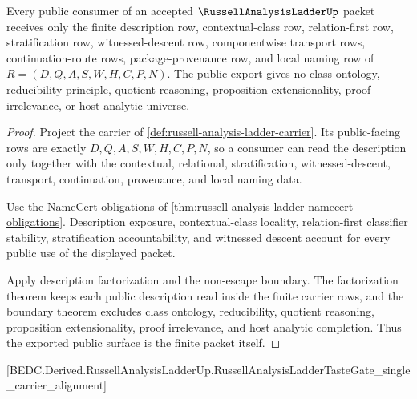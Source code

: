 \begin{theorem}
\label{thm:russell-analysis-ladder-public-export}
Every public consumer of an accepted $\RussellAnalysisLadderUp$ packet receives only the finite description row, contextual-class row, relation-first row, stratification row, witnessed-descent row, componentwise transport rows, continuation-route rows, package-provenance row, and local naming row of $R=(D,Q,A,S,W,H,C,P,N)$. The public export gives no class ontology, reducibility principle, quotient reasoning, proposition extensionality, proof irrelevance, or host analytic universe.
\end{theorem}
\begin{proof}
Project the carrier of \autoref{def:russell-analysis-ladder-carrier}. Its public-facing rows are exactly $D,Q,A,S,W,H,C,P,N$, so a consumer can read the description only together with the contextual, relational, stratification, witnessed-descent, transport, continuation, provenance, and local naming data.

Use the NameCert obligations of \autoref{thm:russell-analysis-ladder-namecert-obligations}. Description exposure, contextual-class locality, relation-first classifier stability, stratification accountability, and witnessed descent account for every public use of the displayed packet.

Apply description factorization and the non-escape boundary. The factorization theorem keeps each public description read inside the finite carrier rows, and the boundary theorem excludes class ontology, reducibility, quotient reasoning, proposition extensionality, proof irrelevance, and host analytic completion. Thus the exported public surface is the finite packet itself.
\end{proof}

[BEDC.Derived.RussellAnalysisLadderUp.RussellAnalysisLadderTasteGate\_single\_carrier\_alignment]

